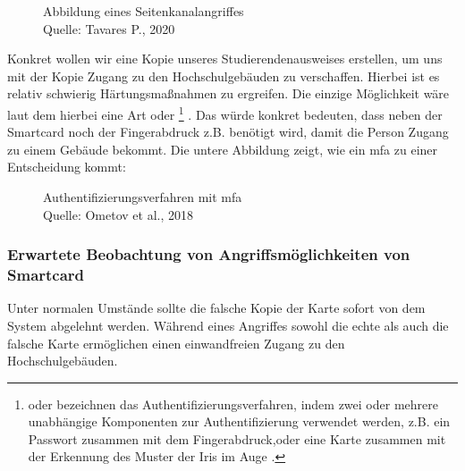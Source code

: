 \begin{figure}[H]
  \caption{Abbildung eines Seitenkanalangriffes\\ Quelle: Tavares P., 2020}
  \label{fig:refart_scpt}
\end{figure}


Konkret wollen wir eine Kopie unseres Studierendenausweises erstellen, um uns mit der Kopie Zugang zu den Hochschulgebäuden 
zu verschaffen. Hierbei ist es relativ schwierig Härtungsmaßnahmen zu ergreifen. Die einzige Möglichkeit wäre laut dem  
hierbei eine Art  oder \footnote{ oder  bezeichnen das 
Authentifizierungsverfahren, indem zwei oder mehrere unabhängige Komponenten zur Authentifizierung verwendet werden, z.B.
ein Passwort zusammen mit dem Fingerabdruck,oder eine Karte zusammen mit der Erkennung des Muster der Iris im Auge 
\cite{refip:simf}.} \cite{refst:2fa}. Das würde konkret bedeuten, dass neben der Smartcard noch der Fingerabdruck z.B. 
benötigt wird, damit die Person Zugang zu einem Gebäude bekommt. Die untere Abbildung zeigt, wie ein \acrshort{mfa} 
zu einer Entscheidung kommt:


\begin{figure}[H]
  \caption{Authentifizierungsverfahren mit \acrshort{mfa} \\ Quelle: Ometov et al., 2018}
  \label{fig:refart_AOMF}
\end{figure}


\subsubsection{Erwartete Beobachtung von Angriffsmöglichkeiten von Smartcard}
Unter normalen Umstände sollte die falsche Kopie der Karte sofort von dem System abgelehnt werden. Während eines Angriffes
sowohl die echte als auch die falsche Karte ermöglichen einen einwandfreien Zugang zu den Hochschulgebäuden.


